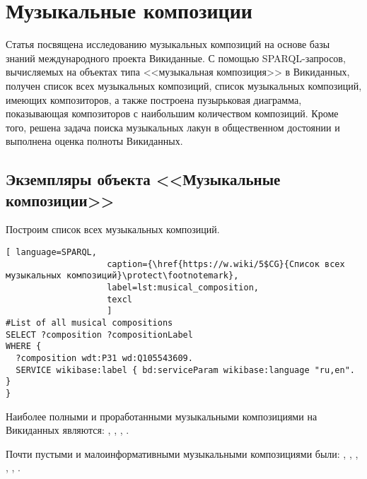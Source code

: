 \chapter{Музыкальные композиции}
\label{ch:musical-composition}
Статья посвящена исследованию музыкальных композиций на основе базы знаний международного проекта Викиданные. С помощью SPARQL-запросов, вычисляемых на объектах типа <<музыкальная композиция>> в Викиданных, получен список всех музыкальных композиций, список музыкальных композиций, имеющих композиторов, а также построена пузырьковая диаграмма, показывающая композиторов с наибольшим количеством композиций. Кроме того, решена задача поиска музыкальных лакун в общественном достоянии и выполнена оценка полноты Викиданных.

\section{Экземпляры объекта <<Музыкальные композиции>>}


Построим список всех музыкальных композиций.

\begin{lstlisting}[ language=SPARQL,
                    caption={\href{https://w.wiki/5$CG}{Список всех  музыкальных композиций}\protect\footnotemark},
                    label=lst:musical_composition,
                    texcl 
                    ]
#List of all musical compositions
SELECT ?composition ?compositionLabel 
WHERE {
  ?composition wdt:P31 wd:Q105543609.
  SERVICE wikibase:label { bd:serviceParam wikibase:language "ru,en". }
}
\end{lstlisting}%

Наиболее полными и проработанными музыкальными композициями на Викиданных являются: , , , .

Почти пустыми и малоинформативными музыкальными композициями были: , , , , , .


